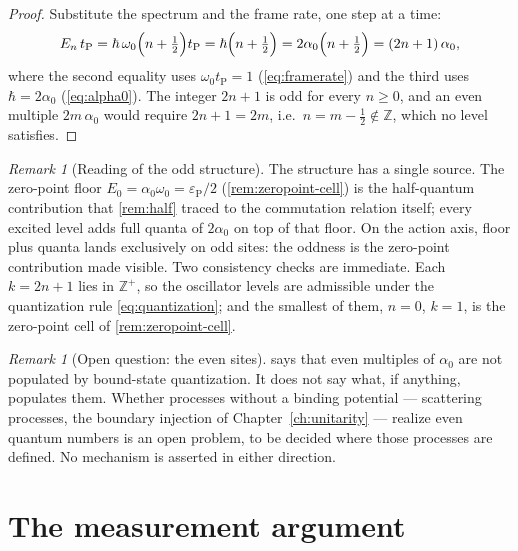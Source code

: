 \documentclass[11pt]{amsbook}
\theoremstyle{plain}
\theoremstyle{definition}
\theoremstyle{remark}
\newtheorem{remark}[theorem]{Remark}
\begin{document}
\begin{proof}
Substitute the spectrum and the frame rate, one step at a time:
\begin{equation}\label{eq:oddsubstitute}
E_{n}\, t_{\mathrm P} = \hbar\,\omega_{0}\Bigl( n + \tfrac{1}{2} \Bigr) t_{\mathrm P} = \hbar\Bigl( n + \tfrac{1}{2} \Bigr) = 2\alpha_{0}\Bigl( n + \tfrac{1}{2} \Bigr) = (2n+1)\,\alpha_{0},
\end{equation}
where the second equality uses $\omega_{0} t_{\mathrm P} = 1$ (\cref{eq:framerate}) and the third uses $\hbar = 2\alpha_{0}$ (\cref{eq:alpha0}). The integer $2n+1$ is odd for every $n \geq 0$, and an even multiple $2m\,\alpha_{0}$ would require $2n + 1 = 2m$, i.e.\ $n = m - \tfrac12 \notin \mathbb{Z}$, which no level satisfies.
\end{proof}

\begin{remark}[Reading of the odd structure]\label{rem:oddreading}
The structure has a single source. The zero-point floor $E_{0} = \alpha_{0}\omega_{0} = \varepsilon_{\mathrm P}/2$ (\cref{rem:zeropoint-cell}) is the half-quantum contribution that \cref{rem:half} traced to the commutation relation itself; every excited level adds full quanta of $2\alpha_{0}$ on top of that floor. On the action axis, floor plus quanta lands exclusively on odd sites: the oddness is the zero-point contribution made visible. Two consistency checks are immediate. Each $k = 2n+1$ lies in $\mathbb{Z}^{+}$, so the oscillator levels are admissible under the quantization rule \cref{eq:quantization}; and the smallest of them, $n = 0$, $k = 1$, is the zero-point cell of \cref{rem:zeropoint-cell}.
\end{remark}

\begin{remark}[Open question: the even sites]\label{rem:evensites}
 says that even multiples of $\alpha_{0}$ are not populated by bound-state quantization. It does not say what, if anything, populates them. Whether processes without a binding potential --- scattering processes, the boundary injection of Chapter~\ref{ch:unitarity} --- realize even quantum numbers is an open problem, to be decided where those processes are defined. No mechanism is asserted in either direction.
\end{remark}

\section{The measurement argument}\label{sec:measurement}
\end{document}
